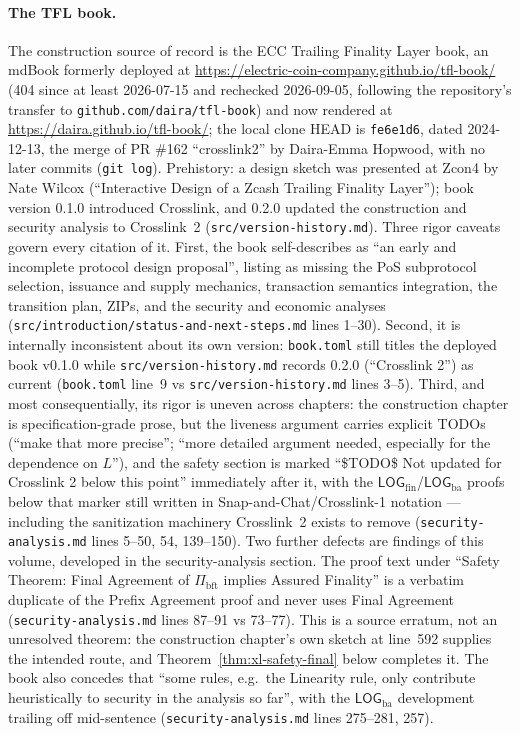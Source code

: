 \documentclass[11pt,a4paper]{article}
\theoremstyle{definition}
\begin{document}
\paragraph{The TFL book.} The construction source of record is the ECC
Trailing Finality Layer book, an mdBook formerly deployed at
\url{https://electric-coin-company.github.io/tfl-book/} (404 since at
least 2026-07-15 and rechecked 2026-09-05, following the repository's transfer to
\texttt{github.com/daira/tfl-book}) and now rendered at
\url{https://daira.github.io/tfl-book/}; the local clone
HEAD is \texttt{fe6e1d6}, dated 2024-12-13, the merge of PR \#162
``crosslink2'' by Daira-Emma Hopwood, with no later commits
(\texttt{git log}). Prehistory: a design sketch
was presented at Zcon4 by Nate Wilcox (``Interactive Design of a Zcash
Trailing Finality Layer''); book version 0.1.0 introduced Crosslink, and
0.2.0 updated the construction and security analysis to Crosslink~2
(\texttt{src/version-history.md}). Three rigor caveats govern every
citation of it. First, the book self-describes as ``an early and
incomplete protocol design proposal'', listing as missing the PoS
subprotocol selection, issuance and supply mechanics, transaction
semantics integration, the transition plan, ZIPs, and the security and
economic analyses (\texttt{src/introduction/status-and-next-steps.md}
lines 1--30). Second, it is internally inconsistent about its own
version: \texttt{book.toml} still titles the deployed book v0.1.0 while
\texttt{src/version-history.md} records 0.2.0 (``Crosslink 2'') as
current (\texttt{book.toml} line~9 vs
\texttt{src/version-history.md} lines 3--5). Third, and most
consequentially, its rigor is uneven across chapters: the construction
chapter is specification-grade prose, but the liveness argument carries
explicit TODOs (``make that more precise''; ``more detailed argument
needed, especially for the dependence on $L$''), and the safety section
is marked ``\$TODO\$ Not updated for Crosslink 2 below this point''
immediately after it, with the
$\mathsf{LOG}_{\mathrm{fin}}$/$\mathsf{LOG}_{\mathrm{ba}}$ proofs below
that marker still written in Snap-and-Chat/Crosslink-1 notation ---
including the sanitization machinery Crosslink~2 exists to remove
(\texttt{security-analysis.md} lines 5--50, 54, 139--150). Two further
defects are findings of this volume, developed in the security-analysis
section. The proof text under ``Safety Theorem: Final Agreement of
$\Pi_{\mathrm{bft}}$ implies Assured Finality'' is a verbatim duplicate
of the Prefix Agreement proof and never uses Final Agreement
(\texttt{security-analysis.md} lines 87--91 vs 73--77). This is a source
erratum, not an unresolved theorem: the construction chapter's own sketch
at line~592 supplies the intended route, and
Theorem~\ref{thm:xl-safety-final} below completes it. The book also
concedes that ``some rules, e.g.\ the Linearity rule, only
contribute heuristically to security in the analysis so far'', with the
$\mathsf{LOG}_{\mathrm{ba}}$ development trailing off mid-sentence
(\texttt{security-analysis.md} lines 275--281, 257).
\end{document}
